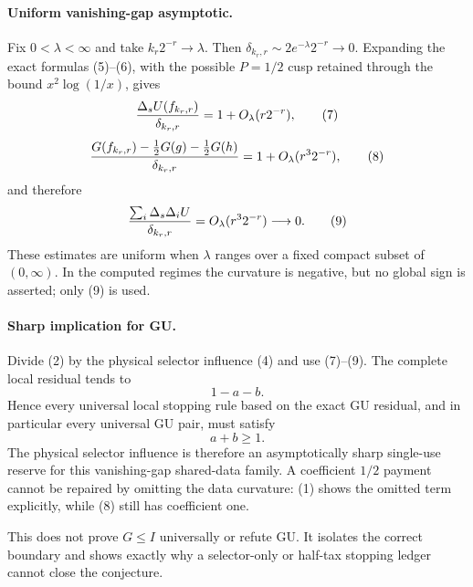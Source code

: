 \paragraph{Uniform vanishing-gap asymptotic.}
Fix $0<\lambda<\infty$ and take $k_r2^{-r}\to\lambda$.  Then
$\delta_{k_r,r}\sim2e^{-\lambda}2^{-r}\to0$.  Expanding the exact formulas
(5)--(6), with the possible $P=1/2$ cusp retained through the bound
$x^2\log(1/x)$, gives
\[
 {\Delta_sU(f_{k_r,r})\over\delta_{k_r,r}}=1+O_\lambda(r2^{-r}),
                                                               \tag{7}
\]
\[
 {G(f_{k_r,r})-\tfrac12G(g)-\tfrac12G(h)\over\delta_{k_r,r}}
 =1+O_\lambda(r^3 2^{-r}),                              \tag{8}
\]
and therefore
\[
 {\sum_i\Delta_s\Delta_iU\over\delta_{k_r,r}}
 =O_\lambda(r^3 2^{-r})\longrightarrow0.               \tag{9}
\]
These estimates are uniform when $\lambda$ ranges over a fixed compact
subset of $(0,\infty)$.  In the computed regimes the curvature is negative,
but no global sign is asserted; only (9) is used.

\paragraph{Sharp implication for GU.}
Divide (2) by the physical selector influence (4) and use (7)--(9).  The
complete local residual tends to
\[
 1-a-b.                                                  \tag{10}
\]
Hence every universal local stopping rule based on the exact GU residual,
and in particular every universal GU pair, must satisfy
\[
 \boxed{a+b\ge1.}                                       \tag{11}
\]
The physical selector influence is therefore an asymptotically sharp
single-use reserve for this vanishing-gap shared-data family.  A coefficient
$1/2$ payment cannot be repaired by omitting the data curvature: (1) shows
the omitted term explicitly, while (8) still has coefficient one.

This does not prove $G\le I$ universally or refute GU.  It isolates the
correct boundary and shows exactly why a selector-only or half-tax stopping
ledger cannot close the conjecture.

